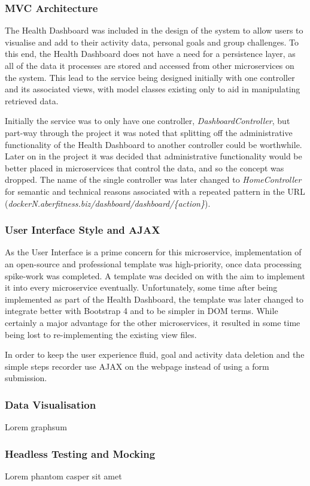 \subsubsection{MVC Architecture}
\par
The Health Dashboard was included in the design of the system to allow users to visualise and add to their activity data, personal goals and group challenges. To this end, the Health Dashboard does not have a need for a persistence layer, as all of the data it processes are stored and accessed from other microservices on the system. This lead to the service being designed initially with one controller and its associated views, with model classes existing only to aid in manipulating retrieved data.

\par
Initially the service was to only have one controller, \textit{DashboardController}, but part-way through the project it was noted that splitting off the administrative functionality of the Health Dashboard to another controller could be worthwhile. Later on in the project it was decided that administrative functionality would be better placed in microservices that control the data, and so the concept was dropped. The name of the single controller was later changed to \textit{HomeController} for semantic and technical reasons associated with a repeated pattern in the URL (\textit{dockerN.aberfitness.biz/dashboard/dashboard/\{action\}}).

\subsubsection{User Interface Style and AJAX}
\par
As the User Interface is a prime concern for this microservice, implementation of an open-source and professional template was high-priority, once data processing spike-work was completed. A template was decided on with the aim to implement it into every microservice eventually. Unfortunately, some time after being implemented as part of the Health Dashboard, the template was later changed to integrate better with Bootstrap 4 and to be simpler in DOM terms. While certainly a major advantage for the other microservices, it resulted in some time being lost to re-implementing the existing view files.

\par
In order to keep the user experience fluid, goal and activity data deletion and the simple steps recorder use AJAX on the webpage instead of using a form submission.

\subsubsection{Data Visualisation}
\par
Lorem graphsum

\subsubsection{Headless Testing and Mocking}
\par
Lorem phantom casper sit amet
